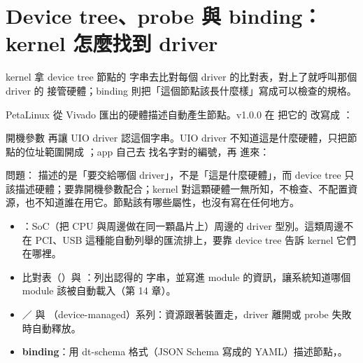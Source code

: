 \clearpage
\section{Device tree、probe 與 binding：kernel 怎麼找到 driver}
\label{sec:probe}

\begin{oneline}
kernel 拿 device tree 節點的  字串去比對每個 driver 的比對表，對上了就呼叫那個 driver 的  接管硬體；binding 則把「這個節點該長什麼樣」寫成可以檢查的規格。
\end{oneline}

\begin{before}
PetaLinux 從 Vivado 匯出的硬體描述自動產生節點。v1.0.0 在  把它的  改寫成 ：


開機參數  再讓 UIO driver 認這個字串。UIO driver 不知道這是什麼硬體，只把節點的位址範圍開成 ；app 自己去  找名字對的編號，再  進來：


問題： 描述的是「要交給哪個 driver」，不是「這是什麼硬體」，而 device tree 只該描述硬體；要靠開機參數配合；kernel 對這顆硬體一無所知，不檢查、不配置資源，也不知道誰在用它。節點該有哪些屬性，也沒有寫在任何地方。
\end{before}

\begin{tech}
\begin{itemize}
\item {}：SoC（把 CPU 與周邊做在同一顆晶片上）周邊的 driver 型別。這類周邊不在 PCI、USB 這種能自動列舉的匯流排上，要靠 device tree 告訴 kernel 它們在哪裡。
\item {} 比對表（）與 ：列出認得的  字串，並寫進 module 的資訊，讓系統知道哪個 module 該被自動載入（第 14 章）。
\item {}／ 與 （device-managed）系列：資源跟著裝置走，driver 離開或 probe 失敗時自動釋放。
\item \textbf{binding}：用 dt-schema 格式（JSON Schema 寫成的 YAML）描述節點，。
\end{itemize}
\end{tech}

